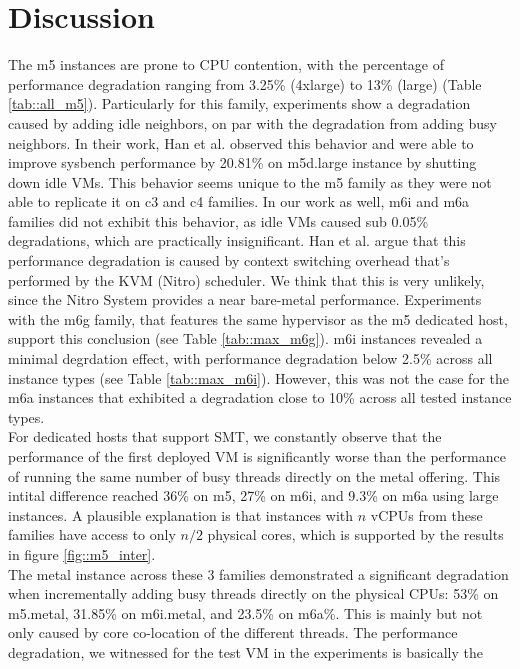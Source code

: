 \section{Discussion}
The m5 instances are prone to CPU contention, with the percentage of performance 
degradation ranging from 3.25\% (4xlarge) to 13\% (large) (Table \ref{tab::all_m5}). 
Particularly for this family, experiments show a degradation caused by adding idle neighbors, on par
with the degradation from adding busy neighbors. In their work, Han et al. \cite{characterizing_public} 
observed this behavior and were able to improve sysbench performance by 20.81\% 
on m5d.large instance by shutting down idle VMs. This behavior seems unique to the m5 family as 
they were not able to replicate it on c3 and c4 families. In our work as well, m6i and m6a families  
did not exhibit this behavior, as idle VMs caused sub 0.05\% degradations, which are practically 
insignificant. Han et al. \cite{characterizing_public} argue that this performance degradation is 
caused by context switching overhead that's performed by the KVM (Nitro) scheduler.
We think that this is very unlikely, since the Nitro System provides a near bare-metal performance.
Experiments with the m6g family, that features the same hypervisor as the m5 dedicated host, 
support this conclusion (see Table \ref{tab::max_m6g}).
m6i instances revealed a minimal degrdation effect, with performance degradation below 2.5\%
across all instance  types (see Table \ref{tab::max_m6i}). However, this was not the case for the m6a 
instances that exhibited a degradation close to 10\% across all tested instance 
types.  \\
For dedicated hosts that support \ac{SMT}, we constantly observe that the performance of the first 
deployed VM is significantly worse than the performance of running the same number of busy threads
directly on the metal offering. This intital difference reached 36\% on m5, 27\% on m6i, and 9.3\% on m6a
using large instances. A plausible explanation is that instances with $n$ vCPUs from these families have 
access to only $n/2$ physical cores, which is supported by the results in figure \ref{fig::m5_inter}. \\
The metal instance across these 3 families demonstrated a significant degradation when incrementally
adding busy threads directly on the physical CPUs: 53\% on m5.metal, 31.85\% on m6i.metal, and 23.5\% 
on m6a\%. This is mainly but not only caused by core co-location of the different threads. 
The performance degradation, we witnessed for the test VM in the experiments is basically the 
